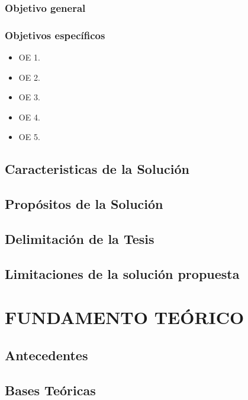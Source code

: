 \documentclass[11pt,oneside,a4paper]{book}
\begin{document}
\subsection{Objetivo general}

\lipsum[2]

\subsection{Objetivos específicos}
\begin{itemize}
    \item OE 1.
    \item OE 2.
    \item OE 3.
    \item OE 4.
    \item OE 5.
\end{itemize}

\newpage
\section{Caracteristicas de la Solución}
\lipsum[1]

\newpage
\section{Propósitos de la Solución}
\lipsum[1]

\newpage
\section{Delimitación de la Tesis}
\lipsum[1]

\newpage
\section{Limitaciones de la solución propuesta}
\lipsum[1]

\chapter[CAPÍTULO II - FUNDAMENTO TEÓRICO]{FUNDAMENTO TEÓRICO}
\lipsum[4-10]

\newpage
\section{Antecedentes}
\lipsum[1]

\newpage
\section{Bases Teóricas}
\lipsum[1]
\end{document}
